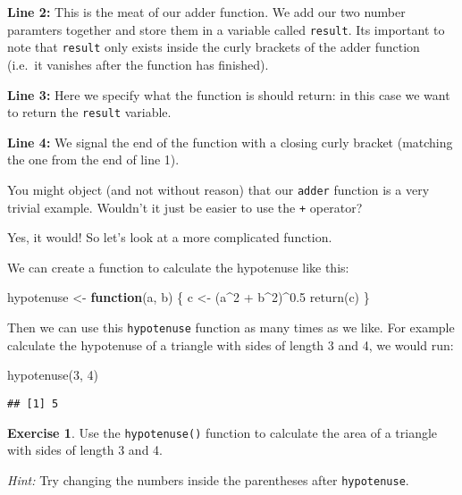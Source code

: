 \documentclass[
]{article}
\newenvironment{Shaded}{\begin{snugshade}}{\end{snugshade}}
\newcommand{\ControlFlowTok}[1]{\textcolor[rgb]{0.13,0.29,0.53}{\textbf{#1}}}
\newcommand{\DecValTok}[1]{\textcolor[rgb]{0.00,0.00,0.81}{#1}}
\newcommand{\FloatTok}[1]{\textcolor[rgb]{0.00,0.00,0.81}{#1}}
\newcommand{\FunctionTok}[1]{\textcolor[rgb]{0.00,0.00,0.00}{#1}}
\newcommand{\NormalTok}[1]{#1}
\newcommand{\OtherTok}[1]{\textcolor[rgb]{0.56,0.35,0.01}{#1}}
\newcommand{\SpecialCharTok}[1]{\textcolor[rgb]{0.00,0.00,0.00}{#1}}
\theoremstyle{definition}
\theoremstyle{definition}
\theoremstyle{definition}
\newtheorem{exercise}{Exercise}[section]
\theoremstyle{definition}
\theoremstyle{remark}
\begin{document}
\textbf{Line 2:} This is the meat of our adder function. We add our two number paramters together and store them in a variable called \texttt{result}. Its important to note that \texttt{result} only exists inside the curly brackets of the adder function (i.e.~it vanishes after the function has finished).

\textbf{Line 3:} Here we specify what the function is should return: in this case we want to return the \texttt{result} variable.

\textbf{Line 4:} We signal the end of the function with a closing curly bracket (matching the one from the end of line 1).

You might object (and not without reason) that our \texttt{adder} function is a very trivial example. Wouldn't it just be easier to use the \texttt{+} operator?

Yes, it would! So let's look at a more complicated function.

We can create a function to calculate the hypotenuse like this:

\begin{Shaded}
\begin{Highlighting}[]
\NormalTok{hypotenuse }\OtherTok{\textless{}{-}} \ControlFlowTok{function}\NormalTok{(a, b) \{}
\NormalTok{  c }\OtherTok{\textless{}{-}}\NormalTok{ (a}\SpecialCharTok{\^{}}\DecValTok{2} \SpecialCharTok{+}\NormalTok{ b}\SpecialCharTok{\^{}}\DecValTok{2}\NormalTok{)}\SpecialCharTok{\^{}}\FloatTok{0.5}
  \FunctionTok{return}\NormalTok{(c)}
\NormalTok{\}}
\end{Highlighting}
\end{Shaded}

Then we can use this \texttt{hypotenuse} function as many times as we like. For example calculate the hypotenuse of a triangle with sides of length 3 and 4, we would run:

\begin{Shaded}
\begin{Highlighting}[]
\FunctionTok{hypotenuse}\NormalTok{(}\DecValTok{3}\NormalTok{, }\DecValTok{4}\NormalTok{)}
\end{Highlighting}
\end{Shaded}

\begin{verbatim}
## [1] 5
\end{verbatim}

\begin{exercise}
Use the \texttt{hypotenuse()} function to calculate the area of a triangle with sides of length 3 and 4.

\emph{Hint:} Try changing the numbers inside the parentheses after \texttt{hypotenuse}.
\end{exercise}
\end{document}
